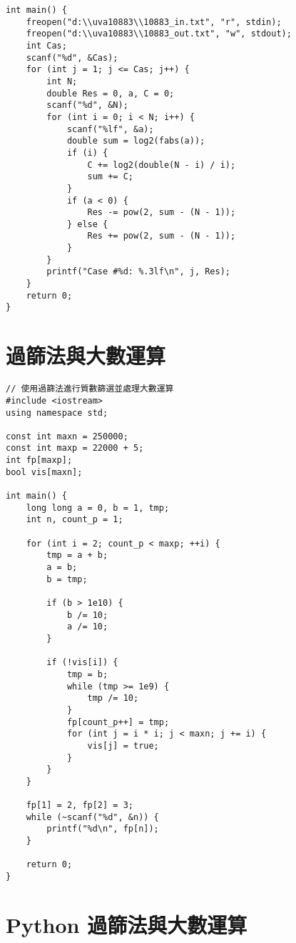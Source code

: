 \documentclass{article}
\begin{document}
\begin{multicols}{2}
\begin{lstlisting}
int main() {
    freopen("d:\\uva10883\\10883_in.txt", "r", stdin);
    freopen("d:\\uva10883\\10883_out.txt", "w", stdout);
    int Cas;
    scanf("%d", &Cas);
    for (int j = 1; j <= Cas; j++) {
        int N;
        double Res = 0, a, C = 0;
        scanf("%d", &N);
        for (int i = 0; i < N; i++) {
            scanf("%lf", &a);
            double sum = log2(fabs(a));
            if (i) {
                C += log2(double(N - i) / i);
                sum += C;
            }
            if (a < 0) {
                Res -= pow(2, sum - (N - 1));
            } else {
                Res += pow(2, sum - (N - 1));
            }
        }
        printf("Case #%d: %.3lf\n", j, Res);
    }
    return 0;
}
\end{lstlisting}

\section{過篩法與大數運算}

\begin{lstlisting}
// 使用過篩法進行質數篩選並處理大數運算
#include <iostream>
using namespace std;

const int maxn = 250000;
const int maxp = 22000 + 5;
int fp[maxp];
bool vis[maxn];

int main() {
    long long a = 0, b = 1, tmp;
    int n, count_p = 1;

    for (int i = 2; count_p < maxp; ++i) {
        tmp = a + b;
        a = b;
        b = tmp;

        if (b > 1e10) {
            b /= 10;
            a /= 10;
        }

        if (!vis[i]) {
            tmp = b;
            while (tmp >= 1e9) {
                tmp /= 10;
            }
            fp[count_p++] = tmp;
            for (int j = i * i; j < maxn; j += i) {
                vis[j] = true;
            }
        }
    }

    fp[1] = 2, fp[2] = 3;
    while (~scanf("%d", &n)) {
        printf("%d\n", fp[n]);
    }

    return 0;
}
\end{lstlisting}

\section{Python 過篩法與大數運算}


\end{multicols}
\end{document}
